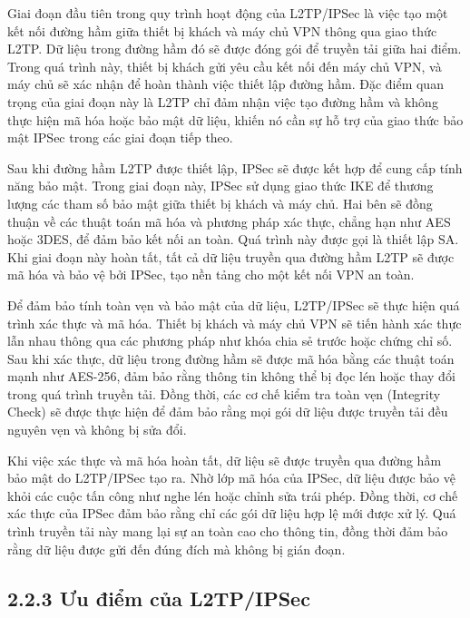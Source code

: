  Giai đoạn đầu tiên trong quy trình hoạt động của L2TP/IPSec là việc tạo một kết nối đường hầm giữa thiết bị khách và máy chủ VPN thông qua giao thức L2TP. Dữ liệu trong đường hầm đó sẽ được đóng gói để truyền tải giữa hai điểm. Trong quá trình này, thiết bị khách gửi yêu cầu kết nối đến máy chủ VPN, và máy chủ sẽ xác nhận để hoàn thành việc thiết lập đường hầm. Đặc điểm quan trọng của giai đoạn này là L2TP chỉ đảm nhận việc tạo đường hầm và không thực hiện mã hóa hoặc bảo mật dữ liệu, khiến nó cần sự hỗ trợ của giao thức bảo mật IPSec trong các giai đoạn tiếp theo.

 Sau khi đường hầm L2TP được thiết lập, IPSec sẽ được kết hợp để cung cấp tính năng bảo mật. Trong giai đoạn này, IPSec sử dụng giao thức IKE để thương lượng các tham số bảo mật giữa thiết bị khách và máy chủ. Hai bên sẽ đồng thuận về các thuật toán mã hóa và phương pháp xác thực, chẳng hạn như AES hoặc 3DES, để đảm bảo kết nối an toàn. Quá trình này được gọi là thiết lập SA. Khi giai đoạn này hoàn tất, tất cả dữ liệu truyền qua đường hầm L2TP sẽ được mã hóa và bảo vệ bởi IPSec, tạo nền tảng cho một kết nối VPN an toàn.

 Để đảm bảo tính toàn vẹn và bảo mật của dữ liệu, L2TP/IPSec sẽ thực hiện quá trình xác thực và mã hóa. Thiết bị khách và máy chủ VPN sẽ tiến hành xác thực lẫn nhau thông qua các phương pháp như khóa chia sẻ trước hoặc chứng chỉ số. Sau khi xác thực, dữ liệu trong đường hầm sẽ được mã hóa bằng các thuật toán mạnh như AES-256, đảm bảo rằng thông tin không thể bị đọc lén hoặc thay đổi trong quá trình truyền tải. Đồng thời, các cơ chế kiểm tra toàn vẹn (Integrity Check) sẽ được thực hiện để đảm bảo rằng mọi gói dữ liệu được truyền tải đều nguyên vẹn và không bị sửa đổi.

 Khi việc xác thực và mã hóa hoàn tất, dữ liệu sẽ được truyền qua đường hầm bảo mật do L2TP/IPSec tạo ra. Nhờ lớp mã hóa của IPSec, dữ liệu được bảo vệ khỏi các cuộc tấn công như nghe lén hoặc chỉnh sửa trái phép. Đồng thời, cơ chế xác thực của IPSec đảm bảo rằng chỉ các gói dữ liệu hợp lệ mới được xử lý. Quá trình truyền tải này mang lại sự an toàn cao cho thông tin, đồng thời đảm bảo rằng dữ liệu được gửi đến đúng đích mà không bị gián đoạn.
 \subsection*{2.2.3 Ưu điểm của L2TP/IPSec}

